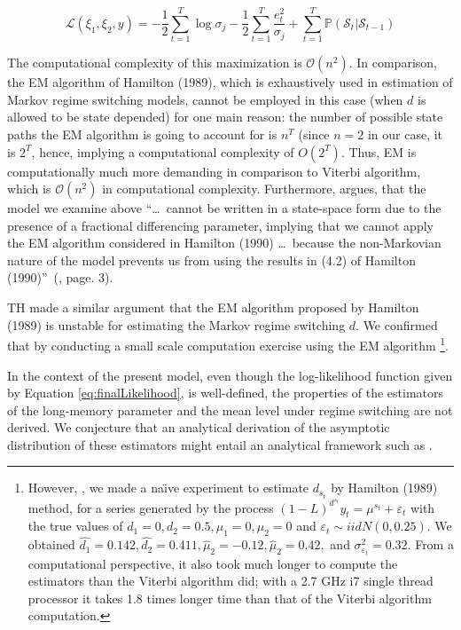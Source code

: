 \documentclass[11pt,fleqn]{article}
\begin{document}
\begin{equation}
\mathcal{L}(\xi _{1},\xi _{2},y)=-\dfrac{1}{2}\sum\limits_{t=1}^{T}\log
\sigma _{j}-\dfrac{1}{2}\sum\limits_{t=1}^{T}\dfrac{e_{t}^{2}}{\sigma _{j}}%
+\sum\limits_{t=1}^{T}\mathbb{P}(\mathcal{S}_{t}|\mathcal{S}_{t-1})
\label{eq:finalLikelihood}
\end{equation}
{The computational complexity of this maximization is $\mathcal{O}(n^{2})$.
In comparison, the EM algorithm of Hamilton (1989), which is exhaustively
used in estimation of Markov regime switching models, cannot be employed in
this case (when $d$ is allowed to be state depended) for one main reason:
the number of possible state paths the EM algorithm is going to account for
is $n^{T}$ (since $n=2$ in our case, it is $2^{T}$, hence, implying a
computational complexity of $O(2^{T})$. Thus, EM is computationally much
more demanding in comparison to Viterbi algorithm, which is $\mathcal{O}%
(n^{2})$ in computational complexity. Furthermore, \cite{Tsay2008} argues, that
the model we examine above  \textquotedblleft \ldots\ cannot be written in a
state-space form due to the presence of a fractional differencing parameter,
implying that we cannot apply the EM algorithm considered in Hamilton (1990)
\ldots\ because the non-Markovian nature of the model prevents us from using
the results in (4.2) of Hamilton (1990)\textquotedblright\ (\citealp{Tsay2008},
page. 3).

TH made a similar argument that the EM algorithm proposed by Hamilton (1989)
is unstable for estimating the Markov regime switching $d$. We confirmed
that by conducting a small scale computation exercise using the EM algorithm%
\footnote{%
However, , we made a na\"{\i}ve experiment to estimate $d_{s_{t}}$ by
Hamilton (1989) method, for a series generated by the process $\left(
1-L\right) ^{d^{s_{t}}}y_{t}=\mu ^{s_{t}}+\varepsilon _{t}$ with the true
values of $d_{1}=0,d_{2}=0.5,\mu _{1}=0,\mu _{2}=0$ and $\varepsilon
_{t}\sim iidN(0,0.25)$. We obtained $\widehat{d_{1}}=0.142,\widehat{d_{2}}%
=0.411,\widehat{\mu }_{2}=-0.12,\widehat{\mu }_{2}=0.42,$ and $\sigma
_{\varepsilon _{t}}^{2}=0.32$. From a computational perspective, it also
took much longer to compute the estimators than the Viterbi algorithm did; with a
2.7 GHz i7 single thread processor it takes 1.8 times longer time than that
of the Viterbi algorithm computation.}.

In the context of the present model, even though the log-likelihood function given by Equation \ref{eq:finalLikelihood}, is well-defined, the properties of the estimators of the long-memory parameter and the mean level under regime switching are not derived. We conjecture that an analytical derivation of the asymptotic distribution of these estimators might entail an analytical framework such as \cite{Hansen2000}.

}
\end{document}
